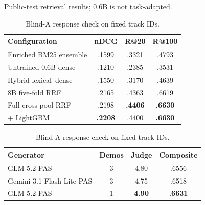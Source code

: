 \documentclass[sigconf]{acmart}
\begin{document}
\begin{table}[!t]
  \begin{minipage}[t]{0.49\textwidth}
    \caption{Public-test retrieval results; 0.6B is not task-adapted.}
    \label{tab:retrieval}
    \centering
    \scriptsize
    \renewcommand{\arraystretch}{0.9}
    \setlength{\tabcolsep}{5pt}
    \begin{tabular}{@{}lccc@{}}
      \toprule
      Configuration & nDCG & R@20 & R@100 \\
      \midrule
      Enriched BM25 ensemble & .1599 & .3321 & .4793 \\
      Untrained 0.6B dense & .1210 & .2385 & .3531 \\
      Hybrid lexical--dense & .1550 & .3170 & .4639 \\
      8B five-fold RRF & .2165 & .4363 & .6619 \\
      Full cross-pool RRF & .2198 & \textbf{.4406} & \textbf{.6630} \\
      + LightGBM & \textbf{.2208} & .4400 & \textbf{.6630} \\
      \bottomrule
    \end{tabular}
  \end{minipage}\hfill
  \begin{minipage}[t]{0.47\textwidth}
    \caption{Blind-A response check on fixed track IDs.}
    \label{tab:response}
    \centering
    \scriptsize
    \renewcommand{\arraystretch}{0.9}
    \setlength{\tabcolsep}{5pt}
    \begin{tabular}{@{}lccc@{}}
      \toprule
      Generator & Demos & Judge & Composite \\
      \midrule
      GLM-5.2 PAS & 3 & 4.80 & .6556 \\
      Gemini-3.1-Flash-Lite PAS & 3 & 4.75 & .6518 \\
      GLM-5.2 PAS & 1 & \textbf{4.90} & \textbf{.6631} \\
      \bottomrule
    \end{tabular}
  \end{minipage}
\end{table}
\end{document}
